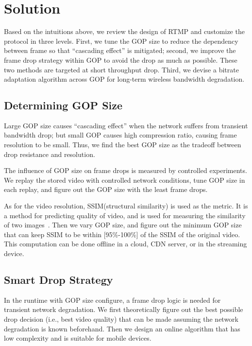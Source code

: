 \newcommand{\Mod}[1]{\text{ (mod } #1\text{)}}
\section{\name Solution}
Based on the intuitions above, we review the design of RTMP and customize the protocol in three levels. First, we tune the GOP size to reduce the dependency between frame so that ``cascading effect'' is mitigated; second, we improve the frame drop strategy within GOP to avoid the drop as much as possible. These two methods are targeted at short throughput drop. Third, we devise a bitrate adaptation algorithm across GOP for long-term wireless bandwidth degradation.

\subsection{Determining GOP Size}
Large GOP size causes ``cascading effect'' when the network suffers from transient bandwidth drop; but small GOP causes high compression ratio, causing frame resolution to be small. Thus, we find the best GOP size as the tradeoff between drop resistance and resolution.

The influence of GOP size on frame drops is measured by controlled experiments. We replay the stored video with controlled network conditions, tune GOP size in each replay, and figure out the GOP size with the least frame drops.

As for the video resolution, SSIM(structural similarity) is used as the metric. It is a method for predicting quality of video, and is used for measuring
the similarity of two images~\cite{wang2004image}. Then we vary GOP size, and figure out the minimum GOP size that can keep SSIM to be within [95\%-100\%] of the SSIM of the original video. This computation can be done offline in a cloud, CDN server, or in the streaming device.


\subsection{Smart Drop Strategy}
\label{subsec:drop-strategy}
In the runtime with GOP size configure, a frame drop logic is needed for transient network degradation. We first theoretically figure out the best possible drop decision (i.e., best video quality) that can be made assuming the network degradation is known beforehand. Then we design an online algorithm that has low complexity and is suitable for mobile devices.

